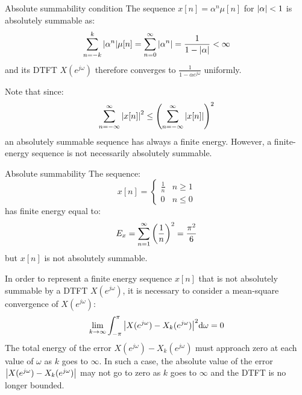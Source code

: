 \documentclass[../../main/main.tex]{subfiles}
\begin{document}
\begin{example}{Absolute summability condition}
    The sequence \( x[n] = \alpha^{n} \mu[n] \) for \( \abs{\alpha} < 1 \) is  absolutely summable as:
    \begin{equation}
        \sum_{n=-k}^{k} \abs{\alpha^{n}} \mu[n]
        =
        \sum_{n=0}^{\infty} \abs{\alpha^{n}}
        =
        \frac{1}{1 - \abs{\alpha}}
        <
        \infty
        \label{eq:L08_S33_1}
    \end{equation}
    and its DTFT \( X(e^{j\omega}) \) therefore converges to \( \frac{1}{1 - \alpha e^{j\omega}} \) uniformly.
\end{example}

Note that since:
\begin{equation}
    \sum_{n=-\infty}^{\infty} \abs{x[n]}^2
    \le
    \qty(\sum_{n=-\infty}^{\infty} \abs{x[n]})^2
    \label{eq:L08_S33_1}
\end{equation}
an absolutely summable sequence has always a finite energy. However, a finite-energy sequence is not necessarily absolutely summable.

\begin{example}{Absolute summability}{}
    The sequence:
    \begin{equation}
        x[n]
        =
        \begin{cases}
            \frac{1}{n} &   n \ge 1 \\
            0   &   n \le 0
        \end{cases}
        \label{eq:L08_S35_1}
    \end{equation}
    has finite energy equal to:
    \begin{equation}
        E_{x}
        =
        \sum_{n=1}^{\infty} \qty(\frac{1}{n})^2
        =
        \frac{\pi^2}{6}
        \label{eq:L08_S35_2}
    \end{equation}
    but \( x[n] \) is not absolutely summable.
\end{example}

In order to represent a finite energy sequence \( x[n] \) that is not absolutely summable by a DTFT \( X(e^{j\omega}) \), it is necessary to consider a mean-square convergence of \( X(e^{j\omega}) \):
\begin{equation}
    \lim_{k \to \infty}
    \int_{-\pi}^{\pi} \abs{X(e^{j\omega}) - X_{k}(e^{j\omega})}^{2} \mathrm{d}{\omega}
    =
    0
    \label{eq:L08_S36_1}
\end{equation}
The total energy of the error \( X(e^{j\omega}) - X_{k}(e^{j\omega}) \) must approach zero at each value of \( \omega \) as \( k \) goes to \( \infty \). In such a case, the absolute value of the error \( \abs{X(e^{j\omega}) - X_{k}(e^{j\omega})} \) may not go to zero as \( k \) goes to \( \infty \) and the DTFT is no longer bounded.
\end{document}
